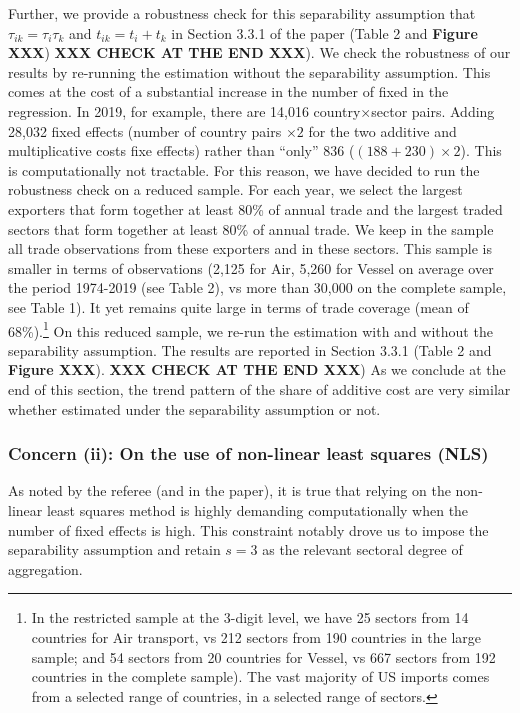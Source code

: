 \documentclass[a4paper,11pt]{article}
\begin{document}
Further, we provide a robustness check for this separability assumption that $\tau_{ik} = \tau_i\tau_{k}$ and
 $t_{ik} = t_i +t_k$ in Section 3.3.1 of the paper (Table 2 and \textbf{Figure XXX}) \textbf{XXX CHECK AT THE END XXX}). We check the robustness of our results by re-running the estimation without the separability assumption. This comes at the cost of a substantial increase in the number of fixed in the regression. In 2019, for example, there are 14,016 country$\times$sector pairs. Adding 28,032 fixed effects (number of country pairs $\times2$ for the two additive and multiplicative costs fixe effects) rather than ``only'' 836 ($(188+230)\times 2$). This is computationally not tractable.
 For this reason, we have decided to run the robustness check on a reduced sample. For each year, we select the largest exporters that form together at least 80\% of annual trade and the largest traded sectors that form together at least 80\% of annual trade.
 We keep in the sample all trade observations from these exporters and in these sectors.
 This sample is smaller in terms of observations (2,125 for Air, 5,260 for Vessel on average over the period 1974-2019 (see Table 2), vs more than 30,000 on the complete sample, see Table 1). It yet remains quite large in terms of trade coverage (mean of 68\%).\footnote{In the restricted sample at the 3-digit level, we have 25 sectors from 14 countries for Air transport, vs 212 sectors from 190 countries in the large sample; and 54 sectors from 20 countries for Vessel, vs 667 sectors from 192 countries in the complete sample). The vast majority of US imports comes from a selected range of countries, in a selected range of sectors.} On this reduced sample, we re-run the estimation with and without the separability assumption. The results are reported in Section 3.3.1 (Table 2 and \textbf{Figure XXX}). \textbf{XXX CHECK AT THE END XXX}) As we conclude at the end of this section, the trend pattern of the share of additive cost are very similar whether estimated under the separability assumption or not.


\subsubsection{Concern (ii): On the use of non-linear least squares (NLS)} As noted by the referee (and in the paper), it is true that relying on the non-linear least squares method is highly demanding computationally when the number of fixed effects is high. This constraint notably drove us to impose the separability assumption and retain $s=3$ as the relevant sectoral degree of aggregation.
\end{document}
